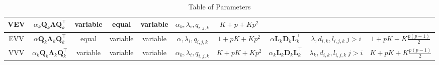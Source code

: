 \begin{table}[h]
{\begin{tabular}{| c | c c c c c c | c c c |}
		VEV	& $ \alpha_k \pmb{Q}_k \pmb{\Lambda} \pmb{Q}_k^\top $ &variable & equal & variable & $ \alpha_k, \lambda_{i}, q_{i,j,k} $ 
				& $ K+p+Kp^2 $ &
					& & \\

		\hline

		EVV	& $ \alpha \pmb{Q}_k \pmb{\Lambda}_k \pmb{Q}_k^\top $ & equal & variable & variable & $ \alpha, \lambda_{i}, q_{i,j,k} $ 
				& $ 1+pK+Kp^2 $ & $ \alpha \pmb{L}_k \pmb{D}_k \pmb{L}_k^\top $ 
					& $ \lambda, d_{i,k}, l_{i,j,k}\ j>i $ & $ 1+pK+K\frac{p(p-1)}{2} $ \\

		VVV	& $ \alpha_k \pmb{Q}_k \pmb{\Lambda}_k \pmb{Q}_k^\top $ & variable & variable & variable & $ \alpha_k, \lambda_{i}, q_{i,j,k} $ 
				& $ K+pK+Kp^2 $ & $ \alpha_k \pmb{L}_k \pmb{D}_k \pmb{L}_k^\top $ 
					& $ \lambda_k, d_{i,k}, l_{i,j,k}\ j>i $ & $ K+pK+K\frac{p(p-1)}{2} $ \\

		\hline

	\end{tabular}

	\label{table:1}

}

\caption{Table of Parameters}

\end{table}
